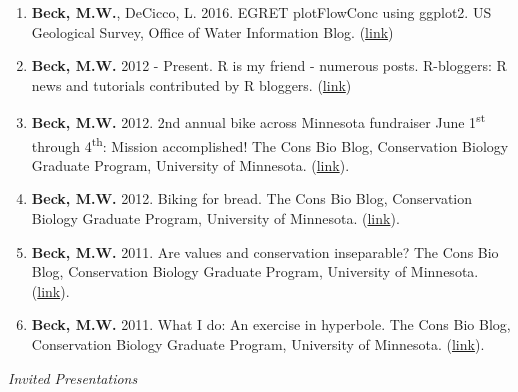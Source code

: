 \documentclass[letterpaper,12pt]{article}
\begin{document}
\begin{enumerate}

\item \textbf{Beck, M.W.}, DeCicco, L. 2016. EGRET plotFlowConc using ggplot2. US Geological Survey, Office of Water Information Blog. ({\footnotesize\href{https://owi.usgs.gov/blog/plotFlowConc/}{link}})

\item \textbf{Beck, M.W.} 2012 - Present. R is my friend - numerous posts. R-bloggers: R news and tutorials contributed by R bloggers. ({\footnotesize\href{https://beckmw.wordpress.com/}{link}})

\item \textbf{Beck, M.W.} 2012. 2nd annual bike across Minnesota fundraiser June 1\textsuperscript{st} through 4\textsuperscript{th}: Mission accomplished! The Cons Bio Blog, Conservation Biology Graduate Program, University of Minnesota. ({\footnotesize\href{https://consbioumn.wordpress.com/2012/06/25/2nd-annual-bike-across-minnesota-fundraiser-june-1st-through-4th-mission-accomplished/}{link}}).

\item \textbf{Beck, M.W.} 2012. Biking for bread. The Cons Bio Blog, Conservation Biology Graduate Program, University of Minnesota. ({\footnotesize\href{https://consbioumn.wordpress.com/2012/05/01/biking-for-bread/}{link}}).

\item \textbf{Beck, M.W.} 2011. Are values and conservation inseparable? The Cons Bio Blog, Conservation Biology Graduate Program, University of Minnesota. ({\footnotesize\href{https://consbioumn.wordpress.com/2011/09/21/are-values-and-conservation-inseparable/}{link}}).

\item \textbf{Beck, M.W.} 2011. What I do: An exercise in hyperbole. The Cons Bio Blog, Conservation Biology Graduate Program, University of Minnesota. ({\footnotesize\href{https://consbioumn.wordpress.com/2011/02/15/what-i-do-an-exercise-in-hyperbole/}{link}}).

\end{enumerate}

\vspace{\baselineskip} 
\centerline{\large{\textit{Invited Presentations}}}
\end{document}
